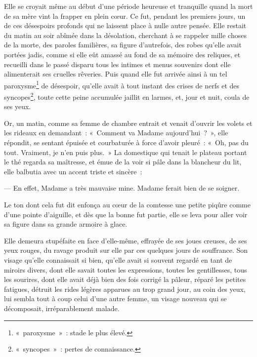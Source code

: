 
{Elle se croyait même au début d'une période heureuse et tranquille quand la mort de sa mère vint la frapper en plein cœur. Ce fut, pendant les premiers jours, un de ces désespoirs profonds qui ne laissent place à nulle autre pensée. Elle restait du matin au soir abîmée dans la désolation, cherchant à se rappeler mille choses de la morte, des paroles familières, sa figure d'autrefois, des robes qu'elle avait portées jadis, comme si elle eût amassé au fond de sa mémoire des reliques, et recueilli dans le passé disparu tous les intimes et menus souvenirs dont elle alimenterait ses cruelles rêveries. Puis quand elle fut arrivée ainsi à un tel paroxysme\footnote{«~paroxysme~»~: stade le plus élevé.} de désespoir, qu'elle avait à tout instant des crises de nerfs et des syncopes\footnote{«~syncopes~»~: pertes de connaissance.}, toute cette peine accumulée jaillit en larmes, et, jour et nuit, coula de ses yeux.

Or, un matin, comme sa femme de chambre entrait et venait d'ouvrir les volets et les rideaux en demandant~: «~Comment va Madame aujourd'hui~?~», elle répondit, se sentant épuisée et courbaturée à force d'avoir pleuré~: «~Oh, pas du tout. Vraiment, je n'en puis plus.~» La domestique qui tenait le plateau portant le thé regarda sa maîtresse, et émue de la voir si pâle dans la blancheur du lit, elle balbutia avec un accent triste et sincère~:

— En effet, Madame a très mauvaise mine. Madame ferait bien de se soigner.

Le ton dont cela fut dit enfonça au cœur de la comtesse une petite piqûre comme d'une pointe d'aiguille, et dès que la bonne fut partie, elle se leva pour aller voir sa figure dans sa grande armoire à glace.

Elle demeura stupéfaite en face d'elle-même, effrayée de ses joues creuses, de ses yeux rouges, du ravage produit sur elle par ces quelques jours de souffrance. Son visage qu'elle connaissait si bien, qu'elle avait si souvent regardé en tant de miroirs divers, dont elle savait toutes les expressions, toutes les gentillesses, tous les sourires, dont elle avait déjà bien des fois corrigé la pâleur, réparé les petites fatigues, détruit les rides légères apparues au trop grand jour, au coin des yeux, lui sembla tout à coup celui d'une autre femme, un visage nouveau qui se décomposait, irréparablement malade.

}
